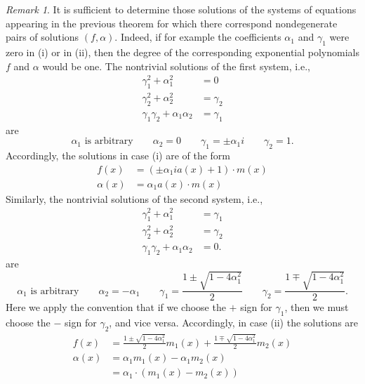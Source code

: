 \documentclass[a4paper,12pt]{article}
\theoremstyle{plain}
\theoremstyle{definition}
\theoremstyle{remark}
\newtheorem*{rem}{Remark}
\begin{document}
 \begin{rem}
 It is sufficient to determine those solutions of the systems of equations appearing in the previous theorem for which there correspond nondegenerate pairs of solutions $(f, \alpha)$. Indeed, if for example the coefficients $\alpha_{1}$ and $\gamma_{1}$ were zero in (i) or in (ii), then the degree of the corresponding exponential polynomials $f$ and $\alpha$ would be one. 
  The nontrivial solutions of the first system, i.e., 
   \begin{align*}
     \gamma_{1}^{2}+\alpha_{1}^2&=0\\
     \gamma_{2}^{2}+\alpha_{2}^2&=\gamma_{2}\\
     \gamma_{1}\gamma_{2}+\alpha_{1}\alpha_{2}&= \gamma_{1}
    \end{align*}
  are 
    \[
     \alpha_{1} \text{ is arbitrary} 
     \qquad 
     \alpha_{2}= 0
     \qquad 
     \gamma_{1}= \pm \alpha_{1}i
     \qquad 
     \gamma_{2}= 1. 
    \]
  Accordingly, the solutions in case (i) are of the form 
 \begin{align*}
  f(x)&= \left(\pm \alpha_{1} i a(x)+1\right)\cdot m(x)\\
  \alpha(x)&= \alpha_{1}a(x)\cdot m(x)  
 \end{align*}
 Similarly, the nontrivial solutions of the second system, i.e., 
\begin{align*}
 \gamma_{1}^{2}+\alpha_{1}^2&=\gamma_{1}\\
 \gamma_{2}^{2}+\alpha_{2}^2&=\gamma_{2}\\
 \gamma_{1}\gamma_{2}+\alpha_{1}\alpha_{2}&= 0. 
 \end{align*}
 are 
 \[
     \alpha_{1} \text{ is arbitrary} 
     \qquad 
     \alpha_{2}= -\alpha_{1}
     \qquad 
     \gamma_{1}= \frac{1\pm \sqrt{1-4\alpha_{1}^2}}{2}
     \qquad 
     \gamma_{2}= \frac{1\mp \sqrt{1-4\alpha_{1}^2}}{2}. 
    \]
 Here we apply the convention that if we choose the $+$ sign for $\gamma_{1}$, then we must choose the $-$ sign for $\gamma_{2}$, and vice versa. 
Accordingly, in case (ii) the solutions are
\begin{align*}
 f(x)&= \frac{1\pm \sqrt{1-4\alpha_{1}^2}}{2} m_{1}(x) + \frac{1\mp \sqrt{1-4\alpha_{1}^2}}{2} m_{2}(x)\\
 \alpha(x)&=\alpha_{1}m_{1}(x)-\alpha_{1}m_{2}(x)\\
 &= \alpha_{1}\cdot (m_{1}(x)-m_{2}(x))
\end{align*}
\end{rem}
\end{document}

